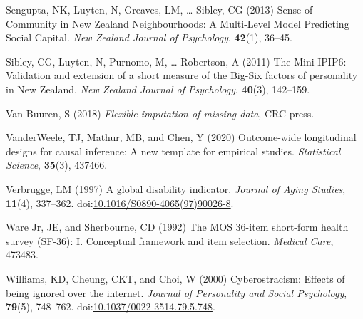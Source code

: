 \documentclass[
  singlecolumn,
  9pt]{article}
\newlength{\cslhangindent}
\newenvironment{CSLReferences}[2] %
 {\begin{list}{}{%
  \setlength{\itemindent}{0pt}
  \setlength{\leftmargin}{0pt}
  \setlength{\parsep}{0pt}
  \ifodd #1
   \setlength{\leftmargin}{\cslhangindent}
   \setlength{\itemindent}{-1\cslhangindent}
  \fi
  \setlength{\itemsep}{#2\baselineskip}}}
 {\end{list}}
\begin{document}
\begin{CSLReferences}{1}{0}
Sengupta, NK, Luyten, N, Greaves, LM, \ldots{} Sibley, CG (2013) Sense
of Community in New Zealand Neighbourhoods: A Multi-Level Model
Predicting Social Capital. \emph{New Zealand Journal of Psychology},
\textbf{42}(1), 36--45.

Sibley, CG, Luyten, N, Purnomo, M, \ldots{} Robertson, A (2011) The
Mini-IPIP6: Validation and extension of a short measure of the Big-Six
factors of personality in New Zealand. \emph{New Zealand Journal of
Psychology}, \textbf{40}(3), 142--159.

Van Buuren, S (2018) \emph{Flexible imputation of missing data}, CRC
press.

VanderWeele, TJ, Mathur, MB, and Chen, Y (2020) Outcome-wide
longitudinal designs for causal inference: A new template for empirical
studies. \emph{Statistical Science}, \textbf{35}(3), 437466.

Verbrugge, LM (1997) A global disability indicator. \emph{Journal of
Aging Studies}, \textbf{11}(4), 337--362.
doi:\href{https://doi.org/10.1016/S0890-4065(97)90026-8}{10.1016/S0890-4065(97)90026-8}.

Ware Jr, JE, and Sherbourne, CD (1992) The MOS 36-item short-form health
survey (SF-36): I. Conceptual framework and item selection.
\emph{Medical Care}, 473483.

Williams, KD, Cheung, CKT, and Choi, W (2000) Cyberostracism: Effects of
being ignored over the internet. \emph{Journal of Personality and Social
Psychology}, \textbf{79}(5), 748--762.
doi:\href{https://doi.org/10.1037/0022-3514.79.5.748}{10.1037/0022-3514.79.5.748}.

\end{CSLReferences}
\end{document}
